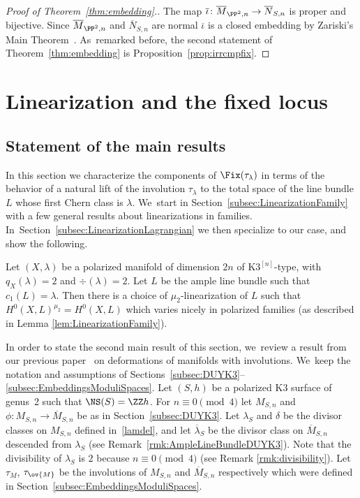\begin{proof}[Proof of Theorem~\ref{thm:embedding}.]
The map $\overline{\iota}\colon\overline{M}_{\PP^2,n}\to\overline{N}_{S,n}$ is proper and bijective.
Since $\overline{M}_{\PP^2,n}$ and $\overline{N}_{S,n}$ are normal
$\overline{\iota}$ is a closed embedding by Zariski's Main Theorem~. As~remarked before, the second statement of Theorem~\ref{thm:embedding} is Proposition~\ref{prop:irrcmpfix}.
\end{proof}

\section{Linearization and the fixed locus}\label{sec:linearization}

\subsection{Statement of the main results}\label{subsec:negzerofiber}

In this section we characterize the components of $\Fix(\tau_\lambda)$ in terms of the behavior of a natural lift of the involution $\tau_\lambda$ to the total space of the line bundle $L$ whose first Chern class is $\lambda$. We~start in Section~\ref{subsec:LinearizationFamily} with a few general results about linearizations in families. In~Section~\ref{subsec:LinearizationLagrangian} we then specialize to our case, and show the following.

\begin{prop}\label{prop:ChoiceLinearizationFamily}
Let $(X,\lambda)$ be a polarized \HK manifold of dimension $2n$ of $\mathrm{K3}^{[n]}$-type, with $q_X(\lambda)=2$ and $\div(\lambda)=2$. Let $L$ be the ample line bundle such that \hbox{$c_1(L)=\lambda$}.
Then there is a choice of $\mu_2$-linearization of $L$ such that $H^0(X,L)^{\mu_2} = H^0(X,L)$ which varies nicely in polarized families (as described in Lemma \ref{lem:LinearizationFamily}).
\end{prop}

In order to state the second main result of this section, we~review a result from our previous paper~\cite{involutions1} on deformations of \HK manifolds with involutions. We~keep the notation and assumptions of Sections~\ref{subsec:DUYK3}--\ref{subsec:EmbeddingsModuliSpaces}.
Let $(S,h)$ be a polarized K3 surface of genus~2 such that $\NS(S)=\ZZ h$.
For $n\equiv 0 \pmod 4$ let $M_{S,n}$ and $\phi\colon M_{S,n}\to \overline{M}_{S,n}$ be as in Section~\ref{subsec:DUYK3}. Let $\lambda_S$ and $\delta$ be the divisor classes on $M_{S,n}$ defined in~\eqref{lamdel}, and let $\overline{\lambda}{}_S$ be the divisor class on $\overline{M}_{S,n}$ descended from $\lambda_S$ (see Remark~\ref{rmk:AmpleLineBundleDUYK3}).
Note that the divisibility of $\lambda_S$ is $2$ because $n\equiv 0 \pmod 4$ (see Remark \ref{rmk:divisibility}).
Let $\tau_M$, $\tau_{\ov{M}}$ be the involutions of $M_{S,n}$ and $\overline{M}_{S,n}$ respectively which were defined in Section~\ref{subsec:EmbeddingsModuliSpaces}.

